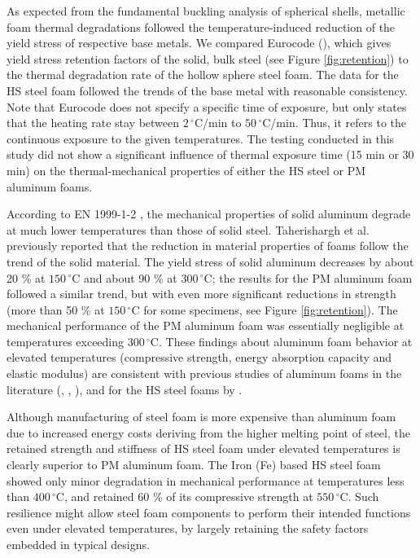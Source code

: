 \documentclass[review]{elsarticle}
\begin{document}
{As expected from the fundamental buckling analysis of spherical shells, metallic foam thermal degradations followed the temperature-induced reduction of the yield stress of respective base metals. We compared Eurocode (\cite{EC3-1-2}), which gives yield stress retention factors of the solid, bulk steel (see Figure \ref{fig:retention}) to the thermal degradation rate of the hollow sphere steel foam. The data for the HS steel foam followed the trends of the base metal with reasonable consistency. Note that Eurocode does not specify a specific time of exposure, but only states that the heating rate stay between  $2\,^{\circ}\mathrm{C}$/min to  $50\,^{\circ}\mathrm{C}$/min. Thus, it refers to the continuous exposure to the given temperatures. The testing conducted in this study did not show a significant influence of thermal exposure time (15 min or 30 min) on the thermal-mechanical properties of either the HS steel or PM aluminum foams.

According to EN 1999-1-2 \cite{EC9-1-2}, the mechanical properties of solid aluminum degrade at much lower temperatures than those of solid steel. Taherishargh et al. \cite{Taherishargh2018} previously reported that the reduction in material properties of foams follow the trend of the solid material. The yield stress of solid aluminum decreases by about 20 \% at $150\,^{\circ}\mathrm{C}$ and about 90 \% at $300\,^{\circ}\mathrm{C}$; the results for the PM aluminum foam followed a similar trend, but with even more significant reductions in strength (more than 50 \% at $150\,^{\circ}\mathrm{C}$ for some specimens, see Figure  \ref{fig:retention}). The mechanical performance of the PM aluminum foam was essentially negligible at temperatures exceeding $300\,^{\circ}\mathrm{C}$. These findings about aluminum foam behavior at elevated temperatures (compressive strength, energy absorption capacity and elastic modulus) are consistent with previous studies of aluminum foams in the literature (\cite{Aly2007}, \cite{Kovacicetal2016}, \cite{Liuetal2016}), and for the HS steel foams by \cite{BekozOktay2014}.

Although manufacturing of steel foam is more expensive than aluminum foam due to increased energy costs deriving from the higher melting point of steel, the retained strength and stiffness of HS steel foam under elevated temperatures is clearly superior to PM aluminum foam. The Iron (Fe) based HS steel foam showed only minor degradation in mechanical performance at temperatures less than $400\,^{\circ}\mathrm{C}$, and retained 60 \% of its compressive strength at $550\,^{\circ}\mathrm{C}$. Such resilience might allow steel foam components to perform their intended functions even under elevated temperatures, by largely retaining the safety factors embedded in typical designs.

}
\end{document}

